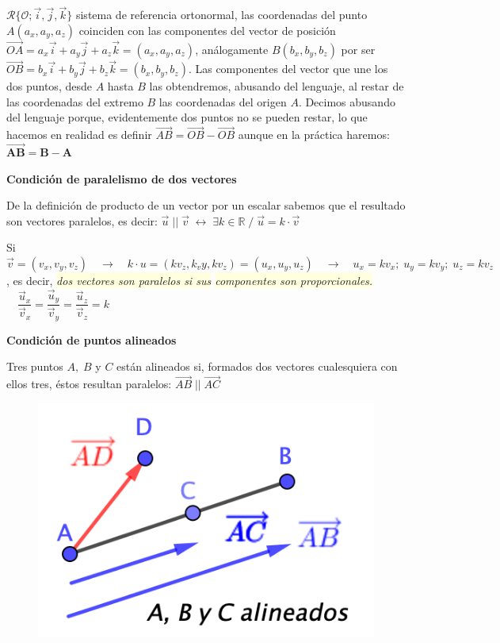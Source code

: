 $\mathcal R\{\mathcal O; \vec i, \vec j, \vec k\}$ sistema de referencia ortonormal, las coordenadas del punto $A(a_x,a_y,a_z)$ coinciden con las componentes del vector de posición $\overrightarrow{OA}=a_x\vec i+a_y \vec j+ a_z\vec k=(a_x,a_y,a_z)$, análogamente $B(b_x,b_y,b_z)$ por ser $\overrightarrow{OB}=b_x\vec i + b_y\vec j+b_z\vec k=(b_x,b_y,b_z)$. Las componentes del vector que une los dos puntos, desde $A$ hasta $B$ las obtendremos, abusando del lenguaje, al restar de las coordenadas del extremo $B$ las coordenadas del origen $A$. Decimos abusando del lenguaje porque, evidentemente dos puntos no se pueden restar, lo que hacemos en realidad es definir $\overrightarrow{AB}=\overrightarrow{OB}-\overrightarrow{OB} $ aunque en la  práctica haremos: $\boldsymbol{\overrightarrow{AB}=B-A}$

\vspace{5mm} \textbf{Condición de paralelismo de dos vectores}

De la definición de producto de un vector por un escalar sabemos que el resultado son vectores paralelos, es decir: $\vec u \; || \; \vec v \; \leftrightarrow \; \exists k \in \mathbb R\; / \; \vec u = k\cdot \vec v$

Si $\vec v=(v_x,v_y,v_z) \quad \to \quad k\cdot u=(kv_z,k_vy,kv_z)=(u_x,u_y,u_z) \quad \longrightarrow \quad u_x=kv_x; \;u_y=kv_y; \;u_z=kv_z$, es decir, \textit{\colorbox{LightYellow}{dos vectores son paralelos si sus} \colorbox{LightYellow}{componentes son proporcionales.}} $\quad \dfrac {\vec u_x}{\vec v_x}=\dfrac {\vec u_y}{\vec v_y}=\dfrac {\vec u_z}{\vec v_z}=k$
	
\vspace{3mm} \textbf{Condición de puntos alineados}

\begin{multicols}{2}
Tres puntos $A,\;B$ y $C$ están alineados si, formados dos vectores cualesquiera con ellos tres, éstos resultan paralelos: $\overrightarrow{AB}\;||\;\overrightarrow{AC}$

\begin{figure}[H]
	\centering
	\includegraphics[width=.35\textwidth]{imagenes/imagenes09/T09IM14.png}
\end{figure}
\end{multicols}

